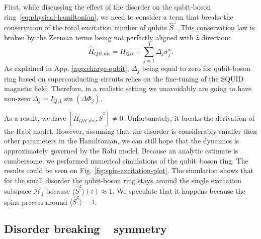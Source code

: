 \documentclass[reprint, aps, prx, amsmath, amssymb, longbibliography, superscriptaddress]{revtex4-2}
\DeclareMathOperator{\Zthree}{\mathbb{Z}_3}
\begin{document}
First, while discussing the effect of the disorder on the qubit-boson ring~\eqref{eq:physical-hamiltonian}, we need to consider a term that breaks the conservation of the total excitation number of qubits $\hat S^z$. This conservation law is broken by the Zeeman terms being not perfectly aligned with $\hat z$ direction:
\begin{equation}
    \hat H_{QB,\text{dis}} = \hat H_{QB} + \sum_{j=1}^3 \Delta_j \sigma_j^x.
\end{equation}
As explained in App. \ref{app:charge-qubit}, $\Delta_j$ being equal to zero for qubit-boson ring based on superconducting circuits relies on the fine-tuning of the SQUID magnetic field. Therefore, in a realistic setting we unavoidably are going to have non-zero $\Delta_j = I_{Q,1}\sin(\Delta \Phi_j)$.



As a result, we have $[\hat H_{QB,\text{dis}}, \hat S^z] \neq 0 $. Unfortunately, it breaks the derivation of the Rabi model. However, assuming that the disorder is considerably smaller then other parameters in the Hamiltonian, we can still hope that the dynamics is approximately governed by the Rabi model. Because an analytic estimate is cumbersome, we performed numerical simulations of the qubit–boson ring. The results could be seen on Fig. \ref{fig:spin-excitation-plot}. The simulation shows that for the small disorder the qubit-boson ring stays around the single excitation subspace $\mathcal{H}_1$ because $\langle \hat S^z \rangle(t) \approx 1$. We speculate that it happens because the spins precess around $\langle \hat S^z \rangle = 1$.


\subsection{Disorder breaking \texorpdfstring{$\Zthree$}{Z3} symmetry}

\end{document}
